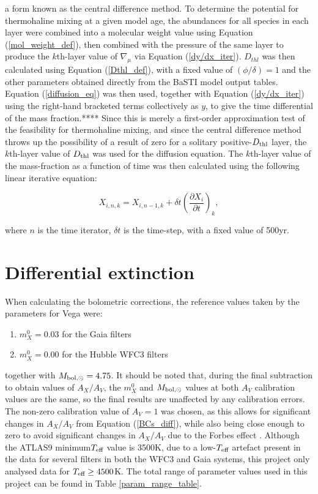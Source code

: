 \documentclass[12pt, a4paper]{report}
\begin{document}
a form known as the central difference method.
To determine the potential for thermohaline mixing at a given model age, the abundances for all species in each layer were combined into a molecular weight value using Equation (\ref{mol_weight_def}), then combined with the pressure of the same layer to produce the $k$th-layer value of $\nabla_{\mu}$ via Equation (\ref{dy/dx_iter}). $D_{thl}$ was then calculated using Equation (\ref{Dthl_def}), with a fixed value of $(\phi/\delta) = 1$ and the other parameters obtained directly from the BaSTI model output tables. Equation (\ref{diffusion_eq}) was then used, together with Equation (\ref{dy/dx_iter}) using the right-hand bracketed terms collectively as $y$, to give the time differential of the mass fraction.**** Since this is merely a first-order approximation test of the feasibility for thermohaline mixing, and since the central difference method throws up the possibility of a result of zero for a solitary positive-$D_{\textnormal{thl}}$ layer, the $k$th-layer value of $D_{\textnormal{thl}}$ was used for the diffusion equation. The $k$th-layer value of the mass-fraction as a function of time was then calculated using the following linear iterative equation:

\begin{equation}
X_{i,n,k} = X_{i,n-1,k} + \delta t \left( \frac{\partial X_{i}}{\partial t}\right)_{k},
\label{iter_timeind}
\end{equation}

where $n$ is the time iterator, $\delta t$ is the time-step, with a fixed value of 500yr.

\section{Differential extinction}
When calculating the bolometric corrections, the reference values taken by the parameters for Vega were:
\begin{enumerate}
\item $m_{X}^{0} = 0.03$ for the Gaia filters
\item $m_{X}^{0} = 0.00$ for the Hubble WFC3 filters
\end{enumerate}

together with $M_{\textnormal{bol},\odot} = 4.75$. It should be noted that, during the final subtraction to obtain values of $A_{X}/A_{V}$, the $m_{X}^{0}$ and $M_{\textnormal{bol},\odot}$ values at both $A_{V}$ calibration values are the same, so the final results are unaffected by any calibration errors. The non-zero calibration value of $A_{V} = 1$ was chosen, as this allows for significant changes in $A_{X}/A_{V}$ from Equation (\ref{BCs_diff}), while also being close enough to zero to avoid significant changes in $A_{X}/A_{V}$ due to the Forbes effect \citep{2008PASP..120..583G}. Although the ATLAS9 minimum$T_{\textnormal{eff}}$ value is 3500K, due to a low-$T_{\textnormal{eff}}$ artefact present in the data for several filters in both the WFC3 and Gaia systems, this project only analysed data for $T_{\textnormal{eff}} \geq 4500$K. The total range of parameter values used in this project can be found in Table \ref{param_range_table}.
\end{document}
